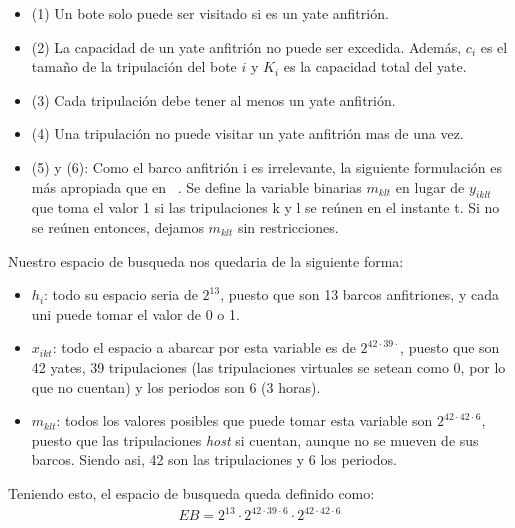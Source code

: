 \documentclass[letter, 10pt]{article}
\begin{document}
\begin{itemize}
\begin{itemize}
        \item (1) Un bote solo puede ser visitado si es un yate anfitrión.
        \item (2) La capacidad de un yate anfitrión no puede ser excedida. Además, $c_i$ es el tamaño de la tripulación del bote $i$ y $K_i$ es la capacidad total del yate.
        \item (3) Cada tripulación debe tener al menos un yate anfitrión.
        \item (4) Una tripulación no puede visitar un yate anfitrión mas de una vez. 
        \item (5) y (6): Como el barco anfitrión i es irrelevante, la siguiente formulación es más apropiada que en ~\cite{Walser:1997:SLP:1867406.1867448}. Se define la variable binarias $m_{klt}$ en lugar de $y_{iklt}$ que toma el valor 1 si las tripulaciones k y l se reúnen en el instante t. Si no se reúnen entonces, dejamos $m_{klt}$ sin restricciones.
    \end{itemize}
\end{itemize}
Nuestro espacio de busqueda nos quedaria de la siguiente forma:
\begin{itemize}
    \item $h_i$: todo su espacio seria de $2^{13}$, puesto que son 13 barcos anfitriones, y cada uni puede tomar el valor de 0 o 1.
    \item $x_{ikt}$: todo el espacio a abarcar por esta variable es de $2^{42\cdot39\cdot}$, puesto que son 42 yates, 39 tripulaciones (las tripulaciones virtuales se setean como 0, por lo que no cuentan) y los periodos son 6 (3 horas).
    \item $m_{klt}$: todos los valores posibles que puede tomar esta variable son $2^{42\cdot42\cdot6}$, puesto que las tripulaciones \textit{host} si cuentan, aunque no se mueven de sus barcos. Siendo asi, 42 son las tripulaciones y 6 los periodos.
\end{itemize}
Teniendo esto, el espacio de busqueda queda definido como:
\begin{align*}
    EB = 2^{13} \cdot 2^{42\cdot39\cdot6} \cdot 2^{42\cdot42\cdot6}
\end{align*}
\end{document}
